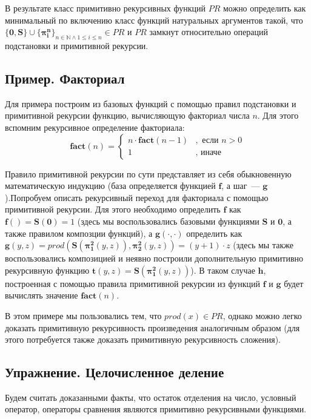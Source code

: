 \documentclass[
    11pt,
    a4paper
]{article}
\theoremstyle{definition}
\begin{document}
В результате класс примитивно рекурсивных функций $\mathit{PR}$ можно определить как минимальный по включению класс функций натуральных аргументов такой, что $\{\mathbf{0}, \mathbf{S}\} \cup \{\mathbf{\pi_i^n}\}_{n \in \mathbb{N} \wedge 1 \leq i \leq n} \in \mathit{PR}$ и $\mathit{PR}$ замкнут относительно операций подстановки и примитивной рекурсии.

\subsection{Пример. Факториал}
Для примера построим из базовых функций с помощью правил подстановки и примитивной рекурсии функцию, вычисляющую факториал числа $n$. Для этого вспомним рекурсивное определение факториала:
$$\mathbf{fact}(n) = \begin{cases} n \cdot \mathbf{fact}(n - 1) &, \text{ если } n > 0\\ 1&, \text{ иначе }\end{cases}$$

Правило примитивной рекурсии по сути представляет из себя обыкновенную математическую индукцию (база определяется функцией $\mathbf{f}$, а шаг~--- $\mathbf{g}$).Попробуем описать рекурсивный переход для факториала с помощью примитивной рекурсии. Для этого необходимо определить $\mathbf{f}$ как $\mathbf{f}() = \mathbf{S}(\mathbf{0}) = 1$ (здесь мы воспользовались базовыми функциями $\mathbf{S}$ и $\mathbf{0}$, а также правилом композции функций), а $\mathbf{g}(\cdot, \cdot)$ определить как $\mathbf{g}(y, z) = prod(\mathbf{S}(\mathbf{\pi_1^2}(y, z)), \mathbf{\pi_2^2}(y, z)) = (y + 1) \cdot z$ (здесь мы также воспользовались композицией и неявно построили дополнительную примитивно рекурсивную функцию $\mathbf{t}(y, z) = \mathbf{S}(\mathbf{\pi_1^2}(y, z))$). В таком случае $\mathbf{h}$, построенная с помощью правила примитивной рекурсии из функций $\mathbf{f}$ и $\mathbf{g}$ будет вычислять значение $\mathbf{fact}(n)$. 

В этом примере мы пользовались тем, что $prod(x) \in \mathit{PR}$, однако можно легко доказать примитивную рекурсивность произведения аналогичным образом (для этого потребуется также доказать примитивную рекурсивность сложения).

\subsection{Упражнение. Целочисленное деление}

Будем считать доказанными факты, что остаток отделения на число, условный оператор, операторы сравнения являются примитивно рекурсивными функциями.
 
\end{document}
